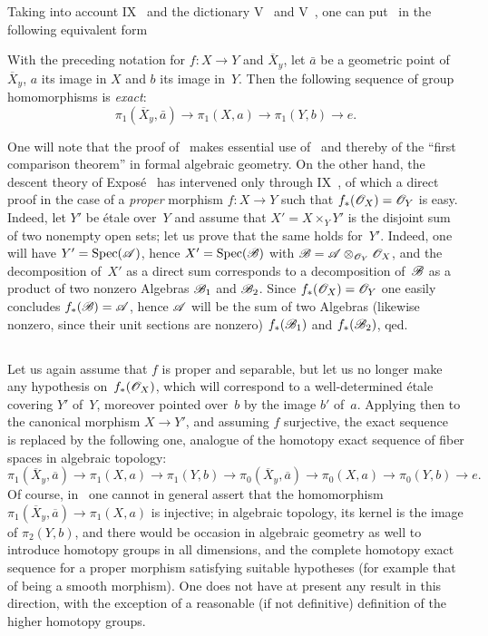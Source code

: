 Taking into account IX~ and the dictionary V~ and
V~, one can put~ in the following
equivalent form

\begin{corollary}
\label{X.1.4}
With the preceding notation for $f\colon X\to Y$ and
$\overline X_y$, let $\bar{a}$ be a geometric point of
$\overline X_y$, $a$ its image in $X$ and $b$ its image
in~$Y$. Then the following sequence of group homomorphisms is
\emph{exact}:
$$
\pi_1(\overline X_y,\bar{a})\to \pi_1(X,a)\to \pi_1(Y,b)\to e.
$$
\end{corollary}

\begin{remarks}
\label{X.1.5}
One will note that the proof of~ makes essential
use of~ and thereby of the ``first
comparison theorem'' in formal algebraic
geometry. On the other hand, the descent theory of
Expos\'e~
has intervened only through IX~, of which
a direct proof in the case of a \emph{proper} morphism
$f\colon X\to Y$ such that $f_*(\cal{O}_X)=\cal{O}_Y$ is easy. Indeed,
let $Y'$ be \'etale over~$Y$ and assume that $X' = X\times_Y Y'$
is the disjoint sum of two nonempty open sets; let us prove that the
same holds for~$Y'$. Indeed, one will have $Y'=\Spec(\cal{A})$, hence
$X'=\Spec(\cal{B})$ with $\cal{B}=\cal{A}\otimes_{\cal{O}_Y}
\cal{O}_X$, and the decomposition of~$X'$ as a direct sum
corresponds to a decomposition of~$\cal{B}$ as a product of two
nonzero Algebras $\cal{B}_1$ and $\cal{B}_2$. Since
$f_*(\cal{O}_X)=\cal{O}_Y$ one easily concludes
$f_*(\cal{B})=\cal{A}$, hence $\cal{A}$ will be the sum of two Algebras
(likewise nonzero, since their unit sections are
nonzero) $f_*(\cal{B}_1)$ and $f_*(\cal{B}_2)$, qed.
\end{remarks}

\subsection{}
\label{X.I.6}
Let us again assume that $f$ is proper and separable, but let us no longer make
any hypothesis on~$f_*(\cal{O}_X)$, which will correspond to a
well-determined \'etale covering $Y'$ of~$Y$,
moreover pointed over~$b$ by the image $b'$
of~$a$. Applying then  to the canonical morphism $X\to Y'$,
and assuming $f$ surjective, the exact sequence~ is
replaced by the following one, analogue of the homotopy exact sequence
of fiber spaces in algebraic topology:
$$
\pi_1(\overline X_y,\overline a)\to \pi_1(X,a)\to \pi_1(Y,b)\to
\pi_0(\overline X_y,\overline a)\to \pi_0(X,a)\to \pi_0(Y,b)\to e.
$$
Of course, in~ one cannot in general
assert that the homomorphism
$\pi_1(\overline X_y,\overline a)\to \pi_1(X,a)$
is injective; in algebraic topology, its kernel is the image of
$\pi_2(Y,b)$, and there would be occasion in algebraic geometry
as well to introduce homotopy groups in all
dimensions, and the complete homotopy exact sequence for a
proper morphism satisfying suitable hypotheses (for
example that of being a smooth
morphism).
One does not have at present
any result in this direction, with the exception of a
reasonable (if not definitive) definition of the higher homotopy
groups.

